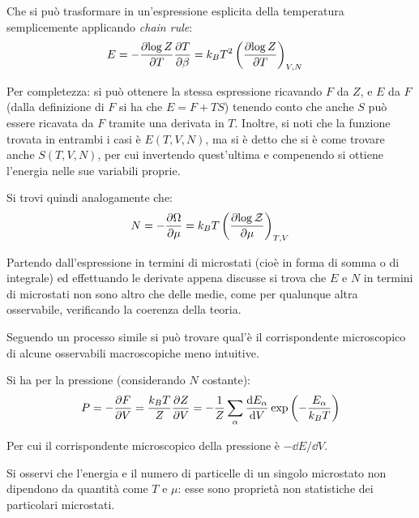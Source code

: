 Che si può trasformare in un'espressione esplicita della temperatura semplicemente applicando \textit{chain rule}:
\begin{align*}
E &= - \frac{\partial {\log Z}}{\partial {T}} \frac{\partial {T}}{\partial {\beta}} = k_B T^2 \left(\frac{\partial {\log Z}}{\partial {T}}\right)_{V,N}
\end{align*}

\noindent Per completezza: si può ottenere la stessa espressione ricavando $F$ da $Z$, e $E$ da $F$ (dalla definizione di $F$ si ha che $E = F + T S$) tenendo conto che anche $S$ può essere ricavata da $F$ tramite una derivata in $T$. Inoltre, si noti che la funzione trovata in entrambi i casi è $E(T,V,N)$, ma si è detto che si è come trovare anche $ S(T,V,N) $, per cui invertendo quest'ultima e compenendo si ottiene l'energia nelle sue variabili proprie.

\begin{ex}
	Si trovi quindi analogamente che:
	\begin{equation*}
	N = - \frac{\partial {\Omega}}{\partial {\mu}} = k_B T \left(\frac{\partial {\log \mathcal{Z}}}{\partial {\mu}}\right)_{T,V}
	\end{equation*}
\end{ex}

Partendo dall'espressione in termini di microstati (cioè in forma di somma o di integrale) ed effettuando le derivate appena discusse si trova che $E$ e $N$ in termini di microstati non sono altro che delle medie, come per qualunque altra osservabile, verificando la coerenza della teoria.

Seguendo un processo simile si può trovare qual'è il corrispondente microscopico di alcune osservabili macroscopiche meno intuitive.

\begin{es}
	\label{es:micropress}
	Si ha per la pressione (considerando $N$ costante):
	\begin{equation*}
	P = - \partdev{F}{V} = \frac{k_B T}{Z} \partdev{Z}{V} = - \frac{1}{Z} \sum_{\alpha} \derivative{E_\alpha}{V} \exp \left(- \frac{E_\alpha}{k_B T}\right)
	\end{equation*}
	
	Per cui il corrispondente microscopico della pressione è $-\dd E /\dd V$.
\end{es}

\noindent Si osservi che l'energia e il numero di particelle di un singolo microstato non dipendono da quantità come $T$ e $\mu$: esse sono proprietà non statistiche dei particolari microstati.

